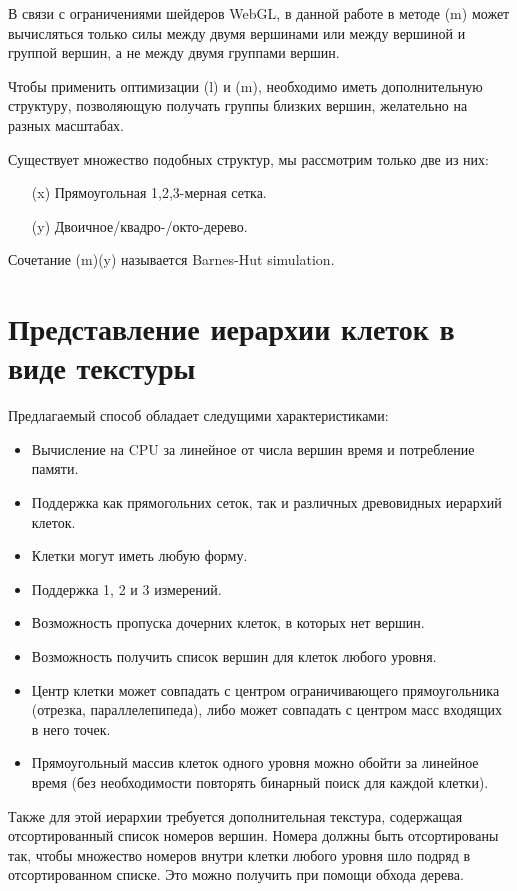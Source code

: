 В связи с ограничениями шейдеров WebGL, в данной работе в методе (m) может вычисляться только силы между двумя вершинами или между вершиной и группой вершин, а не между двумя группами вершин.

Чтобы применить оптимизации (l) и (m), необходимо иметь дополнительную структуру, позволяющую получать группы близких вершин, желательно на разных масштабах.

Существует множество подобных структур, мы рассмотрим только две из них:

\begin{itemize}
\item[(x)] Прямоугольная 1,2,3-мерная сетка.
\item[(y)] Двоичное/квадро-/окто-дерево.
\end{itemize}

Сочетание (m)(y) называется Barnes-Hut simulation.

\section{Представление иерархии клеток в виде текстуры}

\label{sec:struct_texture}

Предлагаемый способ обладает следущими характеристиками:

\begin{itemize}
\item Вычисление на CPU за линейное от числа вершин время и потребление памяти.
\item Поддержка как прямогольних сеток, так и различных древовидных иерархий клеток.
\item Клетки могут иметь любую форму.
\item Поддержка 1, 2 и 3 измерений.
\item Возможность пропуска дочерних клеток, в которых нет вершин.
\item Возможность получить список вершин для клеток любого уровня.
\item Центр клетки может совпадать с центром ограничивающего прямоугольника (отрезка, параллелепипеда), либо может совпадать с центром масс входящих в него точек.
\item Прямоугольный массив клеток одного уровня можно обойти за линейное время (без необходимости повторять бинарный поиск для каждой клетки).
\end{itemize}

Также для этой иерархии требуется дополнительная текстура, содержащая отсортированный список номеров вершин. Номера должны быть отсортированы так, чтобы множество номеров внутри клетки любого уровня шло подряд в отсортированном списке. Это можно получить при помощи обхода дерева.

